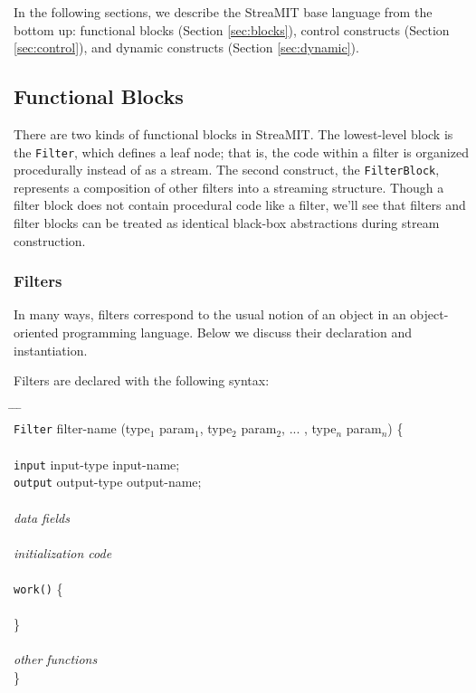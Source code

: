 \documentclass[draft]{article}
\begin{document}
In the following sections, we describe the StreaMIT base language from
the bottom up: functional blocks (Section \ref{sec:blocks}), control
constructs (Section \ref{sec:control}), and dynamic constructs
(Section \ref{sec:dynamic}).

\subsection{Functional Blocks}
\protect\label{sec:blocks}

There are two kinds of functional blocks in StreaMIT.  The
lowest-level block is the {\tt Filter}, which defines a leaf node;
that is, the code within a filter is organized procedurally instead of
as a stream.  The second construct, the {\tt FilterBlock}, represents
a composition of other filters into a streaming structure.  Though a
filter block does not contain procedural code like a filter, we'll see
that filters and filter blocks can be treated as identical black-box
abstractions during stream construction.

\subsubsection{Filters}

In many ways, filters correspond to the usual notion of an object in
an object-oriented programming language.  Below we discuss their
declaration and instantiation.

\medskip
{}
\medskip

Filters are declared with the following syntax:

\begin{tabbing}
\hspace{0.2in} \= \hspace{0.2in} \= \hspace{0.2in} \= \hspace{0.2in} \= \\

{\tt Filter} filter-name (type$_1$ param$_1$, type$_2$ param$_2$,
... , type$_n$ param$_n$) \{ \\ \\

\> {\tt input} input-type input-name; \\
\> {\tt output} output-type output-name; \\ \\

\> {\it data fields} \\ \\

\> {\it initialization code} \\ \\

\> {\tt work()} \{ \\ \\
\> \} \\ \\

\> {\it other functions} \\

\}
\end{tabbing}
\end{document}
